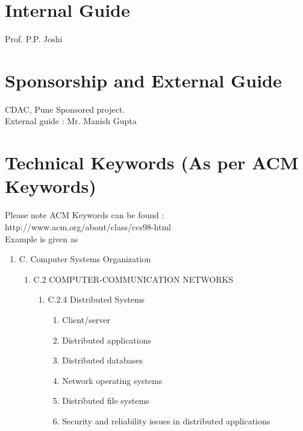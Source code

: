 \documentclass[oneside,a4paper,12pt]{report}
\begin{document}
\section{Internal Guide}
Prof. P.P. Joshi

\section{ Sponsorship and External Guide} 
CDAC, Pune Sponsored project.\\
External guide : Mr. Manish Gupta


\section{Technical Keywords (As per ACM Keywords)}
Please note ACM Keywords can be found : http://www.acm.org/about/class/ccs98-html \\
Example is given as
\begin{enumerate}
	\item C. Computer Systems Organization 
	\begin{enumerate}
		\item C.2 COMPUTER-COMMUNICATION NETWORKS 
		\begin{enumerate}
			\item C.2.4 Distributed Systems 
			\begin{enumerate}
				\item  Client/server 
\item Distributed applications
\item Distributed databases
\item Network operating systems 
\item Distributed file systems
\item Security and reliability issues in distributed applications
	 		\end{enumerate} 
		\end{enumerate} 
	  

	
	\end{enumerate}
\end{enumerate}
\end{document}
